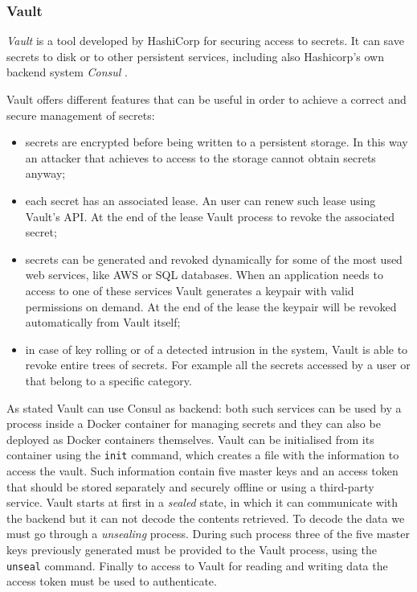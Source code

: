 \documentclass[a4paper,12pt]{article}
\newcommand{\code}[1]{\lstinline|#1|}
\begin{document}
\subsubsection{Vault}

\textit{Vault} \cite{hashicorp_vault} is a tool developed by HashiCorp for
securing access to secrets. It can save secrets to disk or to other persistent
services, including also Hashicorp's own backend system
\textit{Consul} \cite{hashicorp_consul}.\par Vault offers different features that
can be useful in order to achieve a correct and secure management of secrets:
\begin{itemize}
  \item secrets are encrypted before being written to a persistent storage. In
  this way an attacker that achieves to access to the storage cannot
  obtain secrets anyway;
  \item each secret has an associated lease. An user can renew such lease using
  Vault's API. At the end of the lease Vault process to revoke the associated
  secret;
  \item secrets can be generated and revoked dynamically for some of the most
  used web services, like AWS or SQL databases. When an application needs to
  access to one of these services Vault generates a keypair with valid
  permissions on demand. At the end of the lease the keypair will be revoked
  automatically from Vault itself;
  \item in case of key rolling or of a detected intrusion in the system, Vault
  is able to revoke entire trees of secrets. For example all the secrets
  accessed by a user or that belong to a specific category.
\end{itemize}
\par As stated Vault can use Consul as backend: both such services can be used by a process
inside a Docker container for managing secrets and they can also be deployed as
Docker containers themselves. Vault can be initialised from its container using
the \code{init} command, which creates a file with the information to access
the vault. Such information contain five master keys and an access token that
should  be stored separately and securely offline or using a third-party
service. Vault starts at first in a \textit{sealed} state, in which it can
communicate with the backend but it can not decode the contents retrieved. To
decode the data we must go through a \textit{unsealing} process. During such
process three of the five master keys previously generated must be provided to
the Vault process, using the \code{unseal} command. Finally to access to Vault
for reading and writing data the access token must be used to authenticate.  
\end{document}
